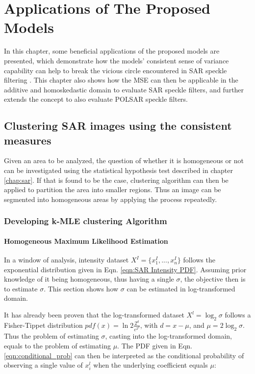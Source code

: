 \chapter{Applications of The Proposed Models} %
\label{chap:applications}

In this chapter, some beneficial applications of the proposed models are presented,
  which demonstrate how the models' consistent sense of variance capability can help to break the vicious circle encountered in SAR speckle
filtering .
This chapter also shows how the MSE can then be 
applicable in the additive and homoskedastic domain to evaluate SAR speckle filters, and further extends the concept to also evaluate
 POLSAR speckle filters. 

\section{Clustering SAR images using the consistent measures}
\label{sec:k_mle}

Given an area to be analyzed, 
  the question of whether it is homogeneous or not can be investigated using
the statistical hypothesis test described in chapter \ref{chap:sar}. 
If that is found to be the case, clustering algorithm can then be applied to partition the area into smaller regions. 
Thus an image can be segmented into homogeneous areas by applying the process repeatedly.

\subsection{Developing k-MLE clustering Algorithm}

\subsubsection{Homogeneous Maximum Likelihood Estimation}

In a window of analysis, intensity dataset $X^I=\{x^I_1,...,x^I_n\}$ follows the exponential distribution given in Eqn. \ref{eqn:SAR Intensity PDF}. 
Assuming prior knowledge of it being homogeneous, thus having a single $\sigma$, the objective then is to estimate $\sigma$. 
This section shows how $\sigma$ can be estimated in log-transformed domain.

It has already been proven that the log-transformed dataset $X^l=\log_2 \sigma$ follows a Fisher-Tippet distribution $pdf(x)= \ln 2 \frac{ 2^d }{ e^{2^d} }$, with $d=x-\mu$, and $\mu=2 \log_2 \sigma$. 
Thus the problem of estimating $\sigma$, casting into the log-transformed domain, equals to the problem of estimating $\mu$. 
The PDF given in Eqn. \ref{eqn:conditional_prob} can then be interpreted as
  the conditional probability of observing a single value of $x^l_i$ when the underlying coefficient equals $\mu$: %

